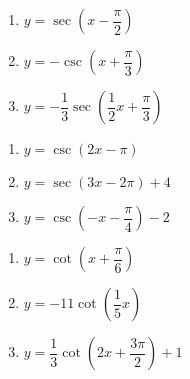 \begin{multicols}{3}

\begin{enumerate}

\setcounter{enumi}{\value{HW}}

\item $y = \sec \left( x - \dfrac{\pi}{2} \right)$  
\item $y = -\csc \left( x + \dfrac{\pi}{3} \right)$  
\item $y = -\dfrac{1}{3} \sec \left( \dfrac{1}{2}x + \dfrac{\pi}{3} \right)$

\setcounter{HW}{\value{enumi}}

\end{enumerate}

\end{multicols}

\begin{multicols}{3}

\begin{enumerate}

\setcounter{enumi}{\value{HW}}

\item $y = \csc (2x - \pi)$  
\item $y = \sec(3x - 2\pi) + 4$  
\item $y = \csc \left( -x - \dfrac{\pi}{4} \right) - 2$

\setcounter{HW}{\value{enumi}}

\end{enumerate}

\end{multicols}

\begin{multicols}{3}

\begin{enumerate}

\setcounter{enumi}{\value{HW}}

\item $y = \cot \left( x + \dfrac{\pi}{6} \right)$  
\item $y = -11\cot \left( \dfrac{1}{5} x \right)$
\item $y = \dfrac{1}{3} \cot \left( 2x + \dfrac{3\pi}{2} \right) + 1$ \label{othergraphslast}

\setcounter{HW}{\value{enumi}}

\end{enumerate}

\end{multicols}

